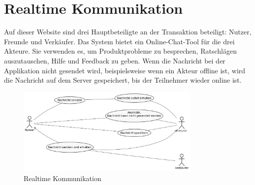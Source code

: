 \section{Realtime Kommunikation}

Auf dieser Website sind drei Hauptbeteiligte an der Transaktion beteiligt: Nutzer, Freunde und Verkäufer. Das System bietet ein Online-Chat-Tool für die  drei Akteure. Sie  verwenden es, um Produktprobleme zu besprechen, Ratschlägen auszutauschen, Hilfe und Feedback zu geben. Wenn die Nachricht bei der Applikation nicht gesendet wird, beispielsweise wenn ein Akteur offline ist, wird die Nachricht  auf dem Server gespeichert, bis der Teilnehmer wieder online ist.

\begin{figure}[htbp]
	\centering
	\includegraphics[width=0.8\textwidth]{uml-diagramme/real-time-communication.png}
	\caption{Realtime Kommunikation}
	\label{fig:real-time-communication}
\end{figure}
